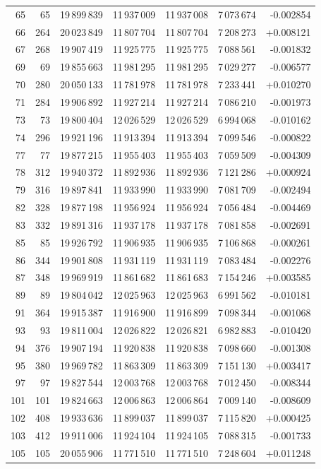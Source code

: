 \begin{longtable}{r r r r r r r}
65 & 65 & 19\,899\,839 & 11\,937\,009 & 11\,937\,008 & 7\,073\,674 & -0.002854\\
66 & 264 & 20\,023\,849 & 11\,807\,704 & 11\,807\,704 & 7\,208\,273 & +0.008121\\
67 & 268 & 19\,907\,419 & 11\,925\,775 & 11\,925\,775 & 7\,088\,561 & -0.001832\\
69 & 69 & 19\,855\,663 & 11\,981\,295 & 11\,981\,295 & 7\,029\,277 & -0.006577\\
70 & 280 & 20\,050\,133 & 11\,781\,978 & 11\,781\,978 & 7\,233\,441 & +0.010270\\
71 & 284 & 19\,906\,892 & 11\,927\,214 & 11\,927\,214 & 7\,086\,210 & -0.001973\\
73 & 73 & 19\,800\,404 & 12\,026\,529 & 12\,026\,529 & 6\,994\,068 & -0.010162\\
74 & 296 & 19\,921\,196 & 11\,913\,394 & 11\,913\,394 & 7\,099\,546 & -0.000822\\
77 & 77 & 19\,877\,215 & 11\,955\,403 & 11\,955\,403 & 7\,059\,509 & -0.004309\\
78 & 312 & 19\,940\,372 & 11\,892\,936 & 11\,892\,936 & 7\,121\,286 & +0.000924\\
79 & 316 & 19\,897\,841 & 11\,933\,990 & 11\,933\,990 & 7\,081\,709 & -0.002494\\
82 & 328 & 19\,877\,198 & 11\,956\,924 & 11\,956\,924 & 7\,056\,484 & -0.004469\\
83 & 332 & 19\,891\,316 & 11\,937\,178 & 11\,937\,178 & 7\,081\,858 & -0.002691\\
85 & 85 & 19\,926\,792 & 11\,906\,935 & 11\,906\,935 & 7\,106\,868 & -0.000261\\
86 & 344 & 19\,901\,808 & 11\,931\,119 & 11\,931\,119 & 7\,083\,484 & -0.002276\\
87 & 348 & 19\,969\,919 & 11\,861\,682 & 11\,861\,683 & 7\,154\,246 & +0.003585\\
89 & 89 & 19\,804\,042 & 12\,025\,963 & 12\,025\,963 & 6\,991\,562 & -0.010181\\
91 & 364 & 19\,915\,387 & 11\,916\,900 & 11\,916\,899 & 7\,098\,344 & -0.001068\\
93 & 93 & 19\,811\,004 & 12\,026\,822 & 12\,026\,821 & 6\,982\,883 & -0.010420\\
94 & 376 & 19\,907\,194 & 11\,920\,838 & 11\,920\,838 & 7\,098\,660 & -0.001308\\
95 & 380 & 19\,969\,782 & 11\,863\,309 & 11\,863\,309 & 7\,151\,130 & +0.003417\\
97 & 97 & 19\,827\,544 & 12\,003\,768 & 12\,003\,768 & 7\,012\,450 & -0.008344\\
101 & 101 & 19\,824\,663 & 12\,006\,863 & 12\,006\,864 & 7\,009\,140 & -0.008609\\
102 & 408 & 19\,933\,636 & 11\,899\,037 & 11\,899\,037 & 7\,115\,820 & +0.000425\\
103 & 412 & 19\,911\,006 & 11\,924\,104 & 11\,924\,105 & 7\,088\,315 & -0.001733\\
105 & 105 & 20\,055\,906 & 11\,771\,510 & 11\,771\,510 & 7\,248\,604 & +0.011248\\
\end{longtable}
